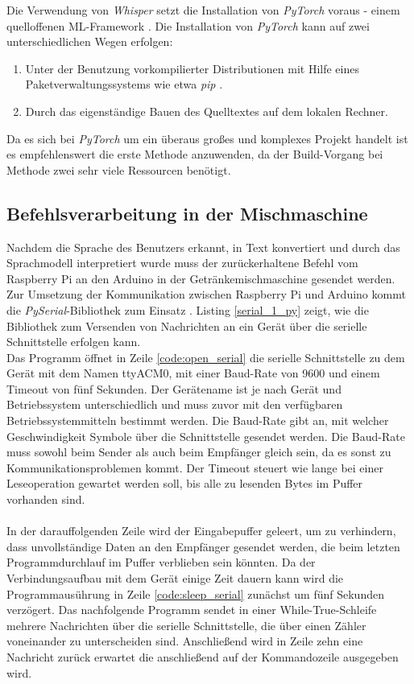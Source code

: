Die Verwendung von \textit{Whisper} setzt die Installation von \textit{PyTorch} voraus - einem quelloffenen \ac{ML}-Framework \cite{pytorch}. Die Installation von \textit{PyTorch} kann auf zwei unterschiedlichen Wegen erfolgen:
\begin{enumerate}
    \item Unter der Benutzung vorkompilierter Distributionen mit Hilfe eines Paketverwaltungssystems wie etwa \textit{pip} \cite{pip}.
    \item Durch das eigenständige Bauen des Quelltextes auf dem lokalen Rechner.
\end{enumerate}
Da es sich bei \textit{PyTorch} um ein überaus großes und komplexes Projekt handelt ist es empfehlenswert die erste Methode anzuwenden, da der Build-Vorgang bei Methode zwei sehr viele Ressourcen benötigt.
\subsection{Befehlsverarbeitung in der Mischmaschine}\label{section:Befehlsverarbeitung}
Nachdem die Sprache des Benutzers erkannt, in Text konvertiert und durch das Sprachmodell interpretiert wurde muss der zurückerhaltene Befehl vom Raspberry Pi an den Arduino in der Getränkemischmaschine gesendet werden. Zur Umsetzung der Kommunikation zwischen Raspberry Pi und Arduino kommt die \textit{PySerial}-Bibliothek zum Einsatz \cite{pyserial}. Listing \ref{serial_1_py} zeigt, wie die Bibliothek zum Versenden von Nachrichten an ein Gerät über die serielle Schnittstelle erfolgen kann.\\

Das Programm öffnet in Zeile \ref{code:open_serial} die serielle Schnittstelle zu dem Gerät mit dem Namen \glqq{}ttyACM0\grqq{}, mit einer Baud-Rate von 9600 und einem Timeout von fünf Sekunden. Der Gerätename ist je nach Gerät und Betriebssystem unterschiedlich und muss zuvor mit den verfügbaren Betriebssystemmitteln bestimmt werden. Die Baud-Rate gibt an, mit welcher Geschwindigkeit Symbole über die Schnittstelle gesendet werden. Die Baud-Rate muss sowohl beim Sender als auch beim Empfänger gleich sein, da es sonst zu Kommunikationsproblemen kommt. Der Timeout steuert wie lange bei einer Leseoperation gewartet werden soll, bis alle zu lesenden Bytes im Puffer vorhanden sind.\\\\
In der darauffolgenden Zeile wird der Eingabepuffer geleert, um zu verhindern, dass unvollständige Daten an den Empfänger gesendet werden, die beim letzten Programmdurchlauf im Puffer verblieben sein könnten. Da der Verbindungsaufbau mit dem Gerät einige Zeit dauern kann wird die Programmausührung in Zeile \ref{code:sleep_serial} zunächst um fünf Sekunden verzögert. Das nachfolgende Programm sendet in einer While-True-Schleife mehrere Nachrichten über die serielle Schnittstelle, die über einen Zähler voneinander zu unterscheiden sind. Anschließend wird in Zeile zehn eine Nachricht zurück erwartet die anschließend auf der Kommandozeile ausgegeben wird.\\\\

